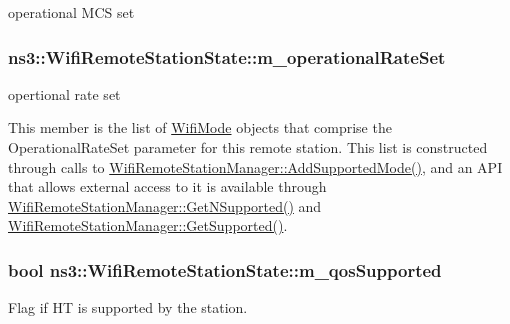 operational M\+CS set 

\subsubsection[{\texorpdfstring{m\+\_\+operational\+Rate\+Set}{m_operationalRateSet}}]{ ns3\+::\+Wifi\+Remote\+Station\+State\+::m\+\_\+operational\+Rate\+Set}\hypertarget{structns3_1_1WifiRemoteStationState_a89e0f91eb71691158e527dd778aded0e}{}\label{structns3_1_1WifiRemoteStationState_a89e0f91eb71691158e527dd778aded0e}


opertional rate set 

This member is the list of \hyperlink{classns3_1_1WifiMode}{Wifi\+Mode} objects that comprise the Operational\+Rate\+Set parameter for this remote station. This list is constructed through calls to \hyperlink{classns3_1_1WifiRemoteStationManager_a90f4d6b042c2692493446d36a3de799f}{Wifi\+Remote\+Station\+Manager\+::\+Add\+Supported\+Mode()}, and an A\+PI that allows external access to it is available through \hyperlink{classns3_1_1WifiRemoteStationManager_a7316bf091ebad5b8cd1a8b5ee47554d8}{Wifi\+Remote\+Station\+Manager\+::\+Get\+N\+Supported()} and \hyperlink{classns3_1_1WifiRemoteStationManager_a995c8bae0d84b168fd3e8bc9ecaacdd4}{Wifi\+Remote\+Station\+Manager\+::\+Get\+Supported()}. 
\subsubsection[{\texorpdfstring{m\+\_\+qos\+Supported}{m_qosSupported}}]{\setlength{\rightskip}{0pt plus 5cm}bool ns3\+::\+Wifi\+Remote\+Station\+State\+::m\+\_\+qos\+Supported}\hypertarget{structns3_1_1WifiRemoteStationState_a856df44e25d231e55c2f50a6f213e6f3}{}\label{structns3_1_1WifiRemoteStationState_a856df44e25d231e55c2f50a6f213e6f3}


Flag if HT is supported by the station. 

